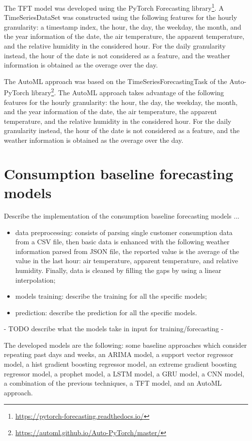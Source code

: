 The TFT model was developed using the PyTorch Forecasting library\footnote{ \url{https://pytorch-forecasting.readthedocs.io/} }.
A TimeSeriesDataSet was constructed using the following features for the hourly granularity: a timestamp index, the hour, the day, the weekday, the month, and the year information of the date, the air temperature, the apparent temperature, and the relative humidity in the considered hour.
For the daily granularity instead, the hour of the date is not considered as a feature, and the weather information is obtained as the overage over the day.

The AutoML approach was based on the TimeSeriesForecastingTask of the Auto-PyTorch library\footnote{ \url{https://automl.github.io/Auto-PyTorch/master/} }.
The AutoML approach takes advantage of the following features for the hourly granularity: the hour, the day, the weekday, the month, and the year information of the date, the air temperature, the apparent temperature, and the relative humidity in the considered hour.
For the daily granularity instead, the hour of the date is not considered as a feature, and the weather information is obtained as the overage over the day.


\section{Consumption baseline forecasting models}
\label{sec:baselineimpl}
\vspace{0.2 cm}

Describe the implementation of the consumption baseline forecasting models ...
\begin{itemize}
  \item data preprocessing: consists of parsing single customer consumption data from a CSV file, then basic data is enhanced with the following weather information parsed from JSON file, the reported value is the average of the value in the last hour: air temperature, apparent temperature, and relative humidity. Finally, data is cleaned by filling the gaps by using a linear interpolation;
  \item models training: describe the training for all the specific models;
  \item prediction: describe the prediction for all the specific models.
\end{itemize}


 - TODO describe what the models take in input for training/forecasting -


The developed models are the following: some baseline approaches which consider repeating past days and weeks, an ARIMA model, a support vector regressor model, a hist gradient boosting regressor model, an extreme gradient boosting regressor model, a prophet model, a LSTM model, a GRU model, a CNN model, a combination of the previous techniques, a TFT model, and an AutoML approach.

